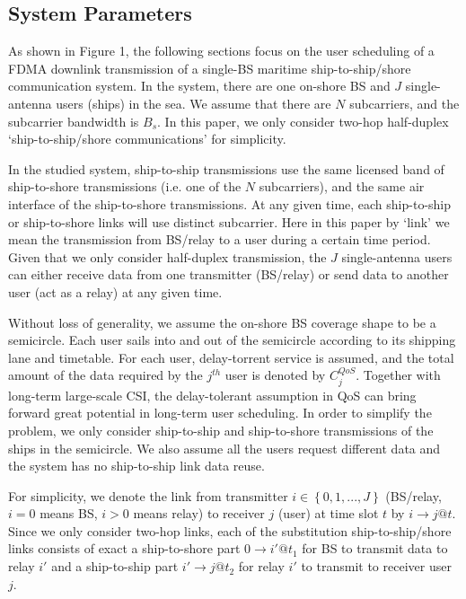 \documentclass[conference]{IEEEtran}
\begin{document}

\subsection{System Parameters}

As shown in Figure 1, the following sections focus on the user scheduling of a FDMA downlink transmission of a single-BS maritime ship-to-ship/shore communication system. In the system, there are one on-shore BS
and  $J$ single-antenna users (ships) in the sea. We assume that there are $N$ subcarriers, and the subcarrier bandwidth is ${B_s}$. In this paper, we only consider two-hop half-duplex `ship-to-ship/shore communications' for simplicity. 

In the studied system, ship-to-ship transmissions use the same licensed band of ship-to-shore transmissions (i.e. one of the $N$ subcarriers), and the same air interface of the ship-to-shore transmissions. 
At any given time, each ship-to-ship or ship-to-shore links will use distinct subcarrier. Here in this paper by `link' we mean the transmission from BS/relay to a user during a certain time period. 
Given that we only consider half-duplex transmission, the $J$ single-antenna users can either receive data from one transmitter (BS/relay) or send data to another user (act as a relay) at any given time. 

Without loss of generality, we assume the on-shore BS coverage shape to be a semicircle. 
Each user sails into and out of the semicircle according to its shipping lane and timetable. 
For each user, delay-torrent service is assumed, and the total amount of the data required by the ${j^{th}}$ user is denoted by $C_j^{QoS}$. Together with long-term large-scale CSI, the delay-tolerant assumption in QoS can bring forward great potential in long-term user scheduling. 
In order to simplify the problem, we only consider ship-to-ship and ship-to-shore transmissions of the ships in the semicircle. We also assume all the users request different data and the system has no ship-to-ship link data reuse. 

For simplicity, we denote the link from transmitter $i \in \left\{ {0,1,...,J} \right\}$ (BS/relay, $i = 0$ means BS, $i > 0$ means relay) to receiver $j$ (user) at time slot $t$ by $i \to j@t$. Since we only consider two-hop links, each of the substitution ship-to-ship/shore links consists of exact a ship-to-shore part $0 \to i'@{t_1}$ for BS to transmit data to relay ${i'}$ and a ship-to-ship part $i' \to j@{t_2}$ for relay ${i'}$ to transmit to receiver user $j$. 
\end{document}
